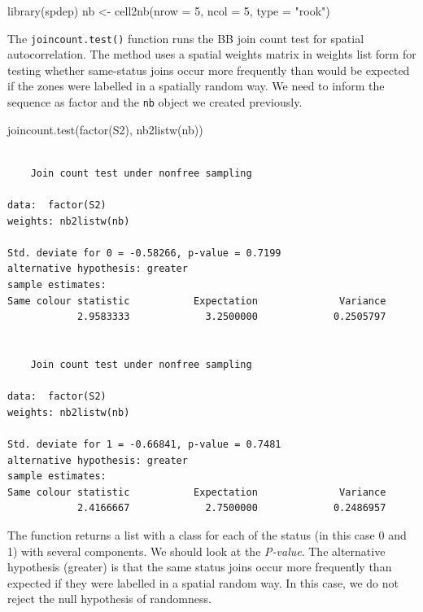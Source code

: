 \documentclass[
  letterpaper,
]{book}
\newenvironment{Shaded}{\begin{snugshade}}{\end{snugshade}}
\newcommand{\AttributeTok}[1]{\textcolor[rgb]{0.40,0.45,0.13}{#1}}
\newcommand{\DecValTok}[1]{\textcolor[rgb]{0.68,0.00,0.00}{#1}}
\newcommand{\FunctionTok}[1]{\textcolor[rgb]{0.28,0.35,0.67}{#1}}
\newcommand{\NormalTok}[1]{\textcolor[rgb]{0.00,0.23,0.31}{#1}}
\newcommand{\OtherTok}[1]{\textcolor[rgb]{0.00,0.23,0.31}{#1}}
\newcommand{\StringTok}[1]{\textcolor[rgb]{0.13,0.47,0.30}{#1}}
\begin{document}
\begin{Shaded}
\begin{Highlighting}[]
\FunctionTok{library}\NormalTok{(spdep)}
\NormalTok{nb }\OtherTok{\textless{}{-}} \FunctionTok{cell2nb}\NormalTok{(}\AttributeTok{nrow =} \DecValTok{5}\NormalTok{,}
              \AttributeTok{ncol =} \DecValTok{5}\NormalTok{,}
              \AttributeTok{type =} \StringTok{"rook"}\NormalTok{)}
\end{Highlighting}
\end{Shaded}

The \texttt{joincount.test()} function runs the BB join count test for
spatial autocorrelation. The method uses a spatial weights matrix in
weights list form for testing whether same-status joins occur more
frequently than would be expected if the zones were labelled in a
spatially random way. We need to inform the sequence as factor and the
\texttt{nb} object we created previously.

\begin{Shaded}
\begin{Highlighting}[]
\FunctionTok{joincount.test}\NormalTok{(}\FunctionTok{factor}\NormalTok{(S2), }
                \FunctionTok{nb2listw}\NormalTok{(nb))}
\end{Highlighting}
\end{Shaded}

\begin{verbatim}

    Join count test under nonfree sampling

data:  factor(S2) 
weights: nb2listw(nb) 

Std. deviate for 0 = -0.58266, p-value = 0.7199
alternative hypothesis: greater
sample estimates:
Same colour statistic           Expectation              Variance 
            2.9583333             3.2500000             0.2505797 


    Join count test under nonfree sampling

data:  factor(S2) 
weights: nb2listw(nb) 

Std. deviate for 1 = -0.66841, p-value = 0.7481
alternative hypothesis: greater
sample estimates:
Same colour statistic           Expectation              Variance 
            2.4166667             2.7500000             0.2486957 
\end{verbatim}

The function returns a list with a class for each of the status (in this
case 0 and 1) with several components. We should look at the
\emph{P-value}. The alternative hypothesis (greater) is that the same
status joins occur more frequently than expected if they were labelled
in a spatial random way. In this case, we do not reject the null
hypothesis of randomness.
\end{document}
